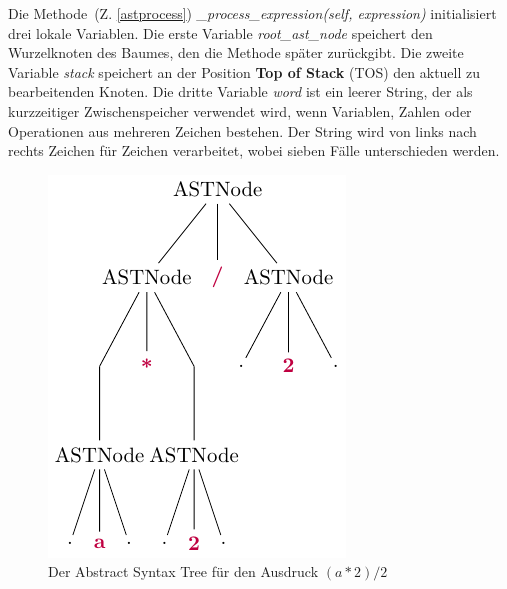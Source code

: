 Die Methode~(Z. \ref{astprocess}) \textit{\_process\_expression(self, expression)} initialisiert drei lokale Variablen.
Die erste Variable \textit{root\_ast\_node} speichert den Wurzelknoten des Baumes, den die Methode später zurückgibt. Die zweite Variable \textit{stack} speichert an der 
Position \textbf{Top of Stack} (TOS) den aktuell zu bearbeitenden Knoten. Die dritte Variable \textit{word} ist ein leerer String, der als kurzzeitiger Zwischenspeicher verwendet wird,
wenn Variablen, Zahlen oder Operationen aus mehreren Zeichen bestehen.
Der String wird von links nach rechts Zeichen für Zeichen verarbeitet, wobei sieben Fälle unterschieden werden.

\begin{figure}
    \vspace{-10mm}
    \begin{center}
      \includegraphics[scale=1.2]{../fig/ast.pdf}
    \end{center}
    \caption{Der Abstract Syntax Tree für den Ausdruck $(a * 2) / 2$}
    \label{fig:astexp}
\end{figure}


